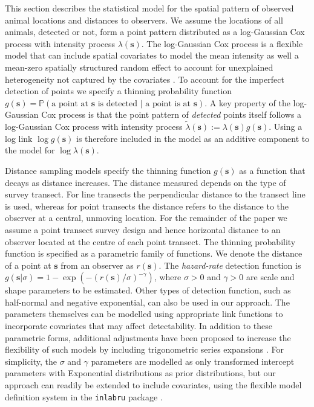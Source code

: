 \documentclass{statsoc}
\newcommand{\bs}{\mathbf{s}}
\newcommand{\tl}{\tilde{\lambda}}   %
\begin{document}
This section describes the statistical model for the spatial pattern of observed animal locations and distances to observers. We assume the locations of all animals, detected or not, form a point pattern distributed as a log-Gaussian Cox process with intensity process $\lambda(\bs)$.  The log-Gaussian Cox process is a flexible model that can include spatial covariates to model the mean intensity as well a mean-zero spatially structured random effect to account for unexplained heterogeneity not captured by the covariates \citep{moller_log_1998}.  To account for the imperfect detection of points we specify a thinning probability function $g(\bs) = \mathbb{P}(\text{a point at $\bs$ is detected } |\text{ a point is at $\bs$})$. A key property of the log-Gaussian Cox process is that the point pattern of \textit{detected} points itself follows a log-Gaussian Cox process with intensity process $\tl(\bs) := \lambda(\bs)g(\bs)$.  Using a log link $\log g(\bs)$ is therefore included in the model as an additive component to the model for $\log \lambda(\bs)$.

Distance sampling models specify the thinning function $g(\bs)$ as a function
that decays as distance increases.  The distance measured depends on the type
of survey transect.  For line transects the perpendicular distance to the
transect line is used, whereas for point transects the distance refers to the
distance to the observer at a central, unmoving location.  For the remainder of
the paper we assume a point transect survey design and hence horizontal distance
to an observer located at the centre of each point transect.  The thinning
probability function is specified as a parametric family of functions. We denote
the distance of a point at $\bs$ from an observer as $r(\bs)$.
The \textit{hazard-rate} detection function is
$g(\bs | \sigma) = 1-\exp(-(r(\bs)/\sigma)^{-\gamma})$, where $\sigma > 0$ and
$\gamma > 0$ are scale and shape parameters to be estimated.
Other types of detection function, such as
half-normal and negative exponential, can also be used in our approach. The parameters themselves
can be modelled using appropriate link functions to incorporate covariates that
may affect detectability.  In addition to these parametric forms, additional
adjustments have been proposed to increase the flexibility of such models by
including trigonometric series expansions \citep{buckland_distance_2015}.
For simplicity, the $\sigma$ and $\gamma$ parameters are modelled as only
transformed intercept parameters with Exponential distributions as prior
distributions, but our approach can readily be extended to include covariates,
using the flexible model definition system in the \texttt{inlabru} package
\citep{lindgren_inlabru_2024, bachl_inlabru_2019}.
\end{document}
